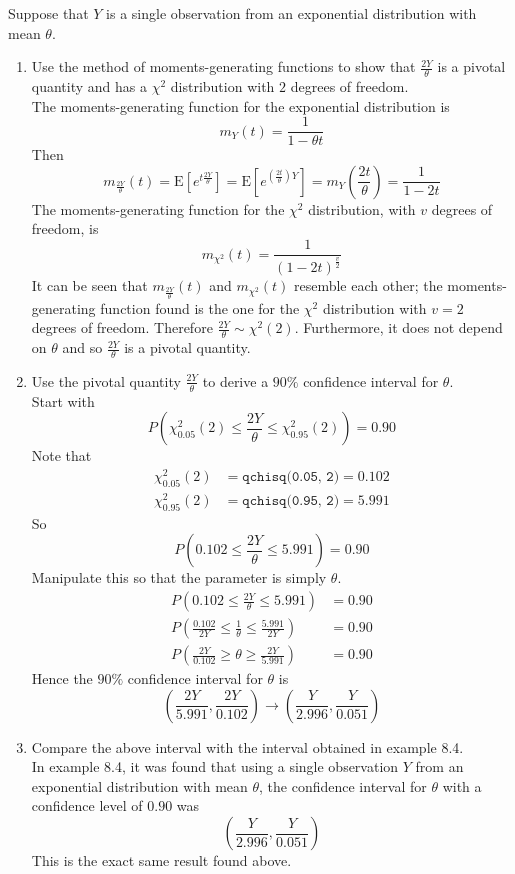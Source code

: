 \documentclass[12pt]{article}
\newcommand{\ques}[1]{\noindent {\bf Question #1: }}
\begin{document}
\ques{8.46} Suppose that $Y$ is a single observation from an exponential distribution with mean $\theta$.
\begin{enumerate} 
\item Use the method of moments-generating functions to show that $\frac{2Y}{\theta}$ is a pivotal quantity and has a $\chi^2$ distribution with $2$ degrees of freedom. \\
The moments-generating function for the exponential distribution is $$ m_Y(t) = \frac{1}{1 - \theta t} $$ Then 
$$ m_{\frac{2Y}{\theta}}(t) = \text{E}[e^{t\frac{2Y}{\theta}}] = \text{E}[e^{\left(\frac{2t}{\theta}\right)Y}] = m_Y\left(\frac{2t}{\theta}\right) = \frac{1}{1- 2t} $$  
The moments-generating function for the $\chi^2$ distribution, with $v$ degrees of freedom, is $$ m_{\chi^2}(t) = \frac{1}{(1-2t)^\frac{v}{2}} $$ 
It can be seen that $m_{\frac{2Y}{\theta}}(t)$ and $m_{\chi^2}(t)$ resemble each other; the moments-generating function found is the one for the $\chi^2$ distribution with $v=2$ degrees of freedom. Therefore $\frac{2Y}{\theta} \sim \chi^2(2)$. Furthermore, it does not depend on $\theta$ and so $\frac{2Y}{\theta}$ is a pivotal quantity. 

\item Use the pivotal quantity $\frac{2Y}{\theta}$ to derive a $90\%$ confidence interval for $\theta$. \\
Start with 
$$ P\left( \chi^2_{0.05}(2) \leq \frac{2Y}{\theta} \leq \chi^2_{0.95}(2)\right) = 0.90 $$  Note that $$ \begin{aligned} \chi^2_{0.05}(2) &= \texttt{qchisq(0.05, 2)} = 0.102 \\ \chi^2_{0.95}(2) &= \texttt{qchisq(0.95, 2)} = 5.991 \end{aligned} $$ So
$$ P( 0.102 \leq \frac{2Y}{\theta} \leq 5.991) = 0.90 $$ Manipulate this so that the parameter is simply $\theta$.
$$ \begin{aligned} P( 0.102 \leq \frac{2Y}{\theta} \leq 5.991) &= 0.90 \\ P \left(\frac{0.102}{2Y} \leq \frac{1}{\theta} \leq \frac{5.991}{2Y} \right) &= 0.90 \\ P\left( \frac{2Y}{0.102} \geq \theta \geq \frac{2Y}{5.991} \right) &= 0.90 \end{aligned} $$ 
Hence the $90\%$ confidence interval for $\theta$ is $$ \left( \frac{2Y}{5.991}, \frac{2Y}{0.102} \right) \to \left( \frac{Y}{2.996}, \frac{Y}{0.051} \right) $$ 

\item Compare the above interval with the interval obtained in example 8.4. \\
In example 8.4, it was found that using a single observation $Y$ from an exponential distribution with mean $\theta$, the confidence interval for $\theta$ with a confidence level of $0.90$ was $$ \left(\frac{Y}{2.996}, \frac{Y}{0.051} \right) $$ 
This is the exact same result found above. 

\end{enumerate}
\end{document}
